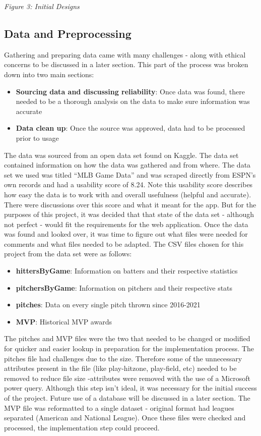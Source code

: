\documentclass[10pt,twocolumn]{article}
\begin{document}
\textit{Figure 3: Initial Designs}

\subsection{Data and Preprocessing}

Gathering and preparing data came with many challenges - along with ethical concerns to be discussed in a later section. This part of the process was broken down into two main sections:

\begin{itemize}
    \item \textbf{Sourcing data and discussing reliability}: Once data was found, there needed to be a thorough analysis on the data to make sure information was accurate
    \item \textbf{Data clean up}: Once the source was approved, data had to be processed prior to usage
\end{itemize}

The data was sourced from an open data set found on Kaggle. The data set contained information on how the data was gathered and from where. The data set we used was titled “MLB Game Data” and was scraped directly from ESPN’s own records and had a usability score of 8.24. Note this usability score describes how easy the data is to work with and overall usefulness (helpful and accurate). There were discussions over this score and what it meant for the app. But for the purposes of this project, it was decided that that state of the data set - although not perfect - would fit the requirements for the web application. \break
\indent Once the data was found and looked over, it was time to figure out what files were needed for comments and what files needed to be adapted. The CSV files chosen for this project from the data set were as follows:

\begin{itemize}
    \item \textbf{hittersByGame}: Information on batters and their respective statistics
    \item \textbf{pitchersByGame}: Information on pitchers and their respective stats
    \item \textbf{pitches}: Data on every single pitch thrown since 2016-2021
    \item \textbf{MVP}: Historical MVP awards
\end{itemize}

The pitches and MVP files were the two that needed to be changed or modified for quicker and easier lookup in preparation for the implementation process. The pitches file had challenges due to the size. Therefore some of the unnecessary attributes present in the file (like play-hitzone,  play-field, etc) needed to be removed to reduce file size -attributes were removed with the use of a Microsoft power query. Although this step isn't ideal, it was necessary for the initial success of the project. Future use of a database will be discussed in a later section. \break
\indent The MVP file was reformatted to a single dataset - original format had leagues separated (American and National League). Once these files were checked and processed, the implementation step could proceed. 
\end{document}
